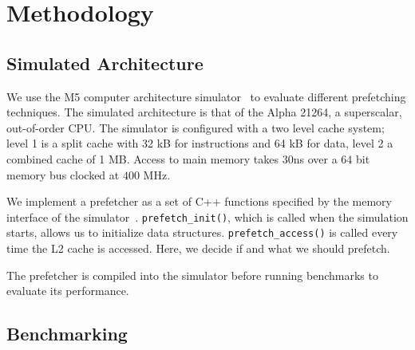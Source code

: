 \section{Methodology}
\label{sec:methodology}

\subsection{Simulated Architecture}

We use the M5 computer architecture simulator~\cite{bib:m5} to
evaluate different prefetching techniques.  The simulated architecture
is that of the Alpha 21264\cite{bib:alpha-21264}, a superscalar,
out-of-order CPU.  The simulator is configured with a two level cache
system; level 1 is a split cache with 32 kB for instructions and 64 kB
for data, level 2 a combined cache of 1 MB.  Access to main memory
takes $30$ns over a $64$ bit memory bus clocked at $400$ MHz.

We implement a prefetcher as a set of C++ functions specified by the
memory interface of the simulator~\cite[Section 3.2]{bib:doc}.
\texttt{prefetch\_init()}, which is called when the simulation starts,
allows us to initialize data structures.  \texttt{prefetch\_access()}
is called every time the L2 cache is accessed.  Here, we decide if and
what we should prefetch.

The prefetcher is compiled into the simulator before running
benchmarks to evaluate its performance.

\subsection{Benchmarking}


